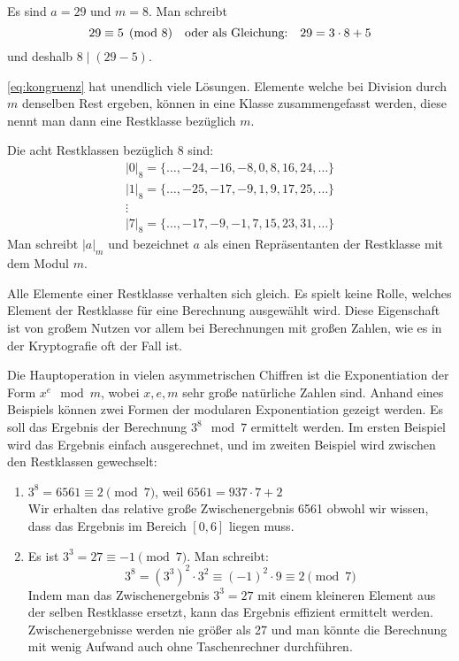 \begin{example}
  Es sind $a = 29$ und $m = 8$. Man schreibt
  \begin{equation*}
    29 \equiv 5 \pmod{8} \text{\quad oder als Gleichung:\quad} 29 = 3 \cdot 8 + 5
  \end{equation*}
  und deshalb $8 \mid (29 - 5)$.
\end{example}

\noindent
\autoref{eq:kongruenz} hat unendlich viele Lösungen.
Elemente welche bei Division durch $m$ denselben Rest ergeben,
können in eine Klasse zusammengefasst werden, diese nennt man dann eine Restklasse bezüglich $m$.
\begin{example}
  Die acht Restklassen bezüglich 8 sind:
  \begin{gather*}
    \vert0\vert_8 = \{\dots,-24,-16,-8,0,8,16,24,\dots\}\\
    \vert1\vert_8 =\{\dots,-25,-17,-9,1,9,17,25,\dots\}\\
    \vdots\\
    \vert7\vert_8 =\{\dots,-17,-9,-1,7,15,23,31,\dots\}
  \end{gather*}
  Man schreibt $|a|_m$ und bezeichnet $a$ als einen
  Repräsentanten der Restklasse mit dem Modul $m$.
\end{example}

\noindent
Alle Elemente einer Restklasse verhalten sich gleich. Es spielt
keine Rolle, welches Element der Restklasse für eine Berechnung ausgewählt wird.
Diese Eigenschaft ist von großem Nutzen vor allem bei Berechnungen mit großen Zahlen,
wie es in der Kryptografie oft der Fall ist.

\begin{example}
  Die Hauptoperation in vielen asymmetrischen Chiffren ist die Exponentiation der Form
  $x^e \mod{m}$, wobei $x,e,m$ sehr große natürliche Zahlen sind. Anhand eines Beispiels können
  zwei Formen der modularen Exponentiation gezeigt werden. Es soll das Ergebnis der
  Berechnung $3^8 \mod{7}$ ermittelt werden. Im ersten Beispiel wird das Ergebnis einfach
  ausgerechnet, und im zweiten Beispiel wird zwischen den Restklassen gewechselt:
  \begin{enumerate}
    \item $3^8 = 6561 \equiv 2 \pmod{7}$, weil $6561 = 937 \cdot 7 + 2$ \\
          Wir erhalten das relative große Zwischenergebnis 6561 obwohl wir wissen,
          dass das Ergebnis im Bereich $[0, 6]$ liegen muss.
    \item Es ist $3^3 = 27 \equiv -1 \pmod{7}$. Man schreibt:
          \begin{equation*}
            3^8 = (3^3)^2 \cdot 3^2 \equiv (-1)^2 \cdot 9 \equiv 2 \pmod{7}
          \end{equation*}
          Indem man das Zwischenergebnis $3^3 = 27$ mit einem kleineren Element aus der selben
          Restklasse ersetzt, kann das Ergebnis effizient ermittelt werden. Zwischenergebnisse
          werden nie größer als 27 und man könnte die Berechnung mit wenig Aufwand auch ohne
          Taschenrechner durchführen. \qedhere
  \end{enumerate}
\end{example}

